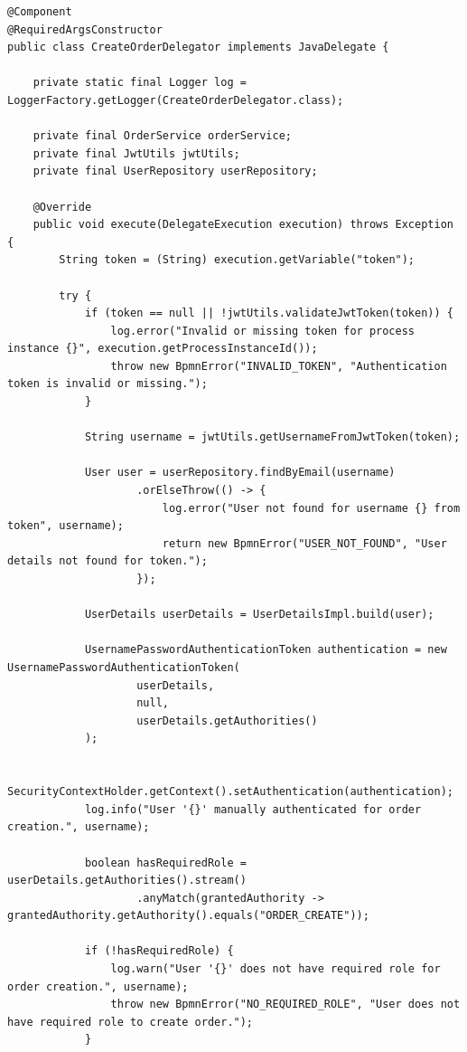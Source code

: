 \documentclass{article}
\begin{document}
\begin{lstlisting}
@Component
@RequiredArgsConstructor
public class CreateOrderDelegator implements JavaDelegate {

    private static final Logger log = LoggerFactory.getLogger(CreateOrderDelegator.class);

    private final OrderService orderService;
    private final JwtUtils jwtUtils;
    private final UserRepository userRepository;

    @Override
    public void execute(DelegateExecution execution) throws Exception {
        String token = (String) execution.getVariable("token");

        try {
            if (token == null || !jwtUtils.validateJwtToken(token)) {
                log.error("Invalid or missing token for process instance {}", execution.getProcessInstanceId());
                throw new BpmnError("INVALID_TOKEN", "Authentication token is invalid or missing.");
            }

            String username = jwtUtils.getUsernameFromJwtToken(token);

            User user = userRepository.findByEmail(username)
                    .orElseThrow(() -> {
                        log.error("User not found for username {} from token", username);
                        return new BpmnError("USER_NOT_FOUND", "User details not found for token.");
                    });

            UserDetails userDetails = UserDetailsImpl.build(user);

            UsernamePasswordAuthenticationToken authentication = new UsernamePasswordAuthenticationToken(
                    userDetails,
                    null,
                    userDetails.getAuthorities()
            );

            SecurityContextHolder.getContext().setAuthentication(authentication);
            log.info("User '{}' manually authenticated for order creation.", username);

            boolean hasRequiredRole = userDetails.getAuthorities().stream()
                    .anyMatch(grantedAuthority -> grantedAuthority.getAuthority().equals("ORDER_CREATE"));

            if (!hasRequiredRole) {
                log.warn("User '{}' does not have required role for order creation.", username);
                throw new BpmnError("NO_REQUIRED_ROLE", "User does not have required role to create order.");
            }


\end{lstlisting}
\end{document}
